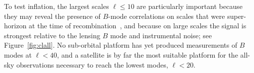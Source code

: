 To test inflation, the largest scales $\ell \leq 10$ are particularly important because they may reveal 
the presence of $B$-mode correlations on scales that were super-horizon at the time of 
recombination~\cite{Lee:2014cya}, 
and because on large scales the signal is strongest relative to the lensing $B$ mode and instrumental 
noise; see Figure~\ref{fig:clall}.
No sub-orbital platform has yet produced measurements of $B$ modes at $\ell< 40$, and a satellite is by 
far the most suitable platform for the all-sky observations necessary to reach the lowest modes, $\ell<20$. 


